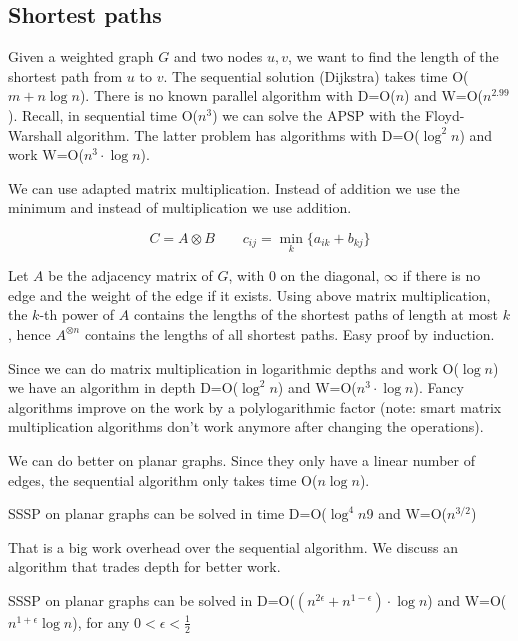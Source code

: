 \subsection{Shortest paths}

Given a weighted graph $G$ and two nodes $u,v$, we want to find the length of the shortest path from $u$ to $v$. The sequential solution (Dijkstra) takes time O($m+n\log n$). There is no known parallel algorithm with D=O($n$) and W=O($n^{2.99}$). Recall, in sequential time O($n^3$) we can solve the APSP with the Floyd-Warshall algorithm. The latter problem has algorithms with D=O($\log^2 n$) and work W=O($n^3\cdot \log n$).

We can use adapted matrix multiplication. Instead of addition we use the minimum and instead of multiplication we use addition.

\[C=A\otimes B\qquad c_{ij} = \min_k \{a_{ik} + b_{kj}\}\]

Let $A$ be the adjacency matrix of $G$, with $0$ on the diagonal, $\infty$ if there is no edge and the weight of the edge if it exists. Using above matrix multiplication, the $k$-th power of $A$ contains the lengths of the shortest paths of length at most $k$, hence $A^{\otimes n}$ contains the lengths of all shortest paths. Easy proof by induction.

Since we can do matrix multiplication in logarithmic depths and work O($\log n$) we have an algorithm in depth D=O($\log ^2 n$) and W=O($n^3\cdot \log n$). Fancy algorithms improve on the work by a polylogarithmic factor (note: smart matrix multiplication algorithms don't work anymore after changing the operations).

We can do better on planar graphs. Since they only have a linear number of edges, the sequential algorithm only takes time O($n \log n$).

\begin{thm}[Cohen 1996] SSSP on planar graphs can be solved in time D=O($\log ^4n$9 and W=O($n^{3/2}$)\end{thm}

That is a big work overhead over the sequential algorithm. We discuss an algorithm that trades depth for better work.

\begin{thm} SSSP on planar graphs can be solved in D=O($(n^{2\epsilon} + n^{1-\epsilon})\cdot \log n$) and W=O($n^{1+\epsilon} \log n$), for any $0<\epsilon < \frac{1}{2}$\end{thm}

